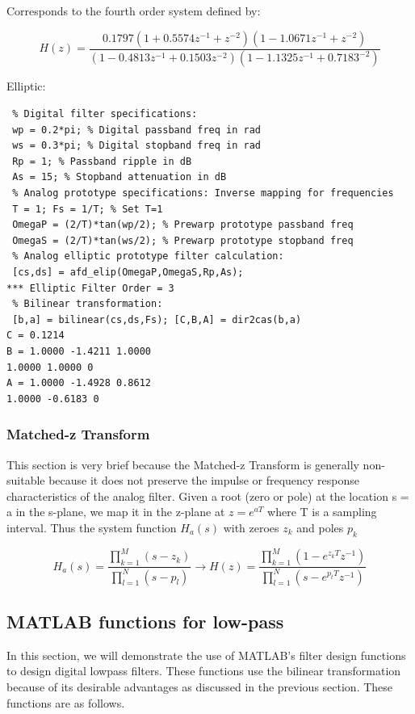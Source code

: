 \documentclass{article}
\begin{document}
Corresponds to the fourth order system defined by:
\begin{center}
    $$H(z)= \frac{0.1797(1+0.5574z^{-1}+z^{-2})(1-1.0671z^{-1}+z^{-2})}{(1-0.4813z^{-1}+0.1503z^{-2})(1-1.1325z^{-1}+0.7183^{-2})}$$
\end{center}
Elliptic: 
\begin{lstlisting}
 % Digital filter specifications:
 wp = 0.2*pi; % Digital passband freq in rad
 ws = 0.3*pi; % Digital stopband freq in rad
 Rp = 1; % Passband ripple in dB
 As = 15; % Stopband attenuation in dB
 % Analog prototype specifications: Inverse mapping for frequencies
 T = 1; Fs = 1/T; % Set T=1  
 OmegaP = (2/T)*tan(wp/2); % Prewarp prototype passband freq
 OmegaS = (2/T)*tan(ws/2); % Prewarp prototype stopband freq
 % Analog elliptic prototype filter calculation:
 [cs,ds] = afd_elip(OmegaP,OmegaS,Rp,As);
*** Elliptic Filter Order = 3
 % Bilinear transformation:
 [b,a] = bilinear(cs,ds,Fs); [C,B,A] = dir2cas(b,a)
C = 0.1214
B = 1.0000 -1.4211 1.0000
1.0000 1.0000 0
A = 1.0000 -1.4928 0.8612
1.0000 -0.6183 0
\end{lstlisting}
\subsubsection{Matched-z Transform}
This section is very brief because the Matched-z Transform is generally non-suitable because it does not preserve the impulse or frequency response characteristics of the analog filter. Given a root (zero or pole) at the location s = a in the s-plane, we map it in the z-plane at $z=e^{aT}$ where T is a sampling interval. Thus the system function $H_a(s)$ with zeroes {$z_k$} and poles {$p_k$}

\begin{equation}
H_a(s) = \frac{\prod_{k=1}^{M}(s-z_k)}{\prod_{l=1}^{N}(s-p_l)}\rightarrow H(z)=\frac{\prod_{k=1}^{M}(1-e^{z_kT}z^{-1})}{\prod_{l=1}^{N}(s-e^{p_tT}z^{-1})}
\end{equation}
\newpage
\subsection{MATLAB functions for low-pass}
In this section, we will demonstrate the use of MATLAB's filter design
functions to design digital lowpass filters. These functions use the bilinear
transformation because of its desirable advantages as discussed in the
previous section. These functions are as follows.
\end{document}
